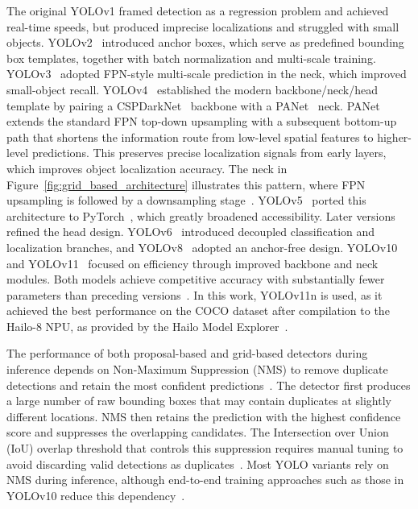 \documentclass[12pt,oneside,bibtotoc,liststotoc]{scrbook}
\begin{document}
The original YOLOv1 framed detection as a regression problem and achieved real-time speeds, but produced imprecise localizations and struggled with small objects.
YOLOv2~\cite{redmon2017yolo9000} introduced anchor boxes, which serve as predefined bounding box templates, together with batch normalization and multi-scale training.
YOLOv3~\cite{redmon2018yolov3} adopted FPN-style multi-scale prediction in the neck, which improved small-object recall.
YOLOv4~\cite{bochkovskiy2020yolov4} established the modern backbone/neck/head template by pairing a CSPDarkNet~\cite{wang2020cspnet} backbone with a PANet~\cite{liu2018PANet} neck.
PANet extends the standard FPN top-down upsampling with a subsequent bottom-up path that shortens the information route from low-level spatial features to higher-level predictions.
This preserves precise localization signals from early layers, which improves object localization accuracy.
The neck in Figure~\ref{fig:grid_based_architecture} illustrates this pattern, where FPN upsampling is followed by a downsampling stage~\cite{liu2018PANet}.
YOLOv5~\cite{khanam2024yolov5} ported this architecture to PyTorch~\cite{paszke2019pytorch}, which greatly broadened accessibility.
Later versions refined the head design.
YOLOv6~\cite{li2022yolov6} introduced decoupled classification and localization branches, and YOLOv8~\cite{yaseen2024yolov8} adopted an anchor-free design.
YOLOv10~\cite{wang2024yolov10} and YOLOv11~\cite{khanam2024yolov11} focused on efficiency through improved backbone and neck modules.
Both models achieve competitive accuracy with substantially fewer parameters than preceding versions~\cite{advzemovic2025deepLearningMultiObjectTrackingSurvey}.
In this work, YOLOv11n is used, as it achieved the best performance on the COCO dataset after compilation to the Hailo-8 NPU, as provided by the
Hailo Model Explorer~\cite{hailoModelExplorer2026}.

The performance of both proposal-based and grid-based detectors during inference depends on
Non-Maximum Suppression (NMS) to remove duplicate detections and retain the most confident
predictions~\cite{girshick2014RCNN}. The detector first produces a large number of raw bounding
boxes that may contain duplicates at slightly different locations. NMS then retains the prediction
with the highest confidence score and suppresses the overlapping candidates. The Intersection over
Union (IoU) overlap threshold that controls this suppression requires manual tuning to avoid
discarding valid detections as
duplicates~\cite{advzemovic2025deepLearningMultiObjectTrackingSurvey, zhao2024DETRsBeatYolosRealTimeObjectDetection}.
Most YOLO variants rely on NMS during inference, although end-to-end training approaches such as
those in YOLOv10 reduce this dependency~\cite{ge2021yolox}.
\end{document}
